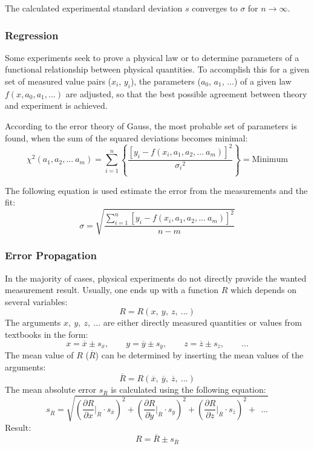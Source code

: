 The calculated experimental standard deviation $s$ converges to $\sigma$ for $n\to\infty$.

\subsubsection{Regression}
\label{subsubsec:Regression}
Some experiments seek to prove a physical law or to determine parameters of a functional relationship between physical quantities. To accomplish this for a given set of measured value pairs ($x_i$, $y_i$), the parameters ($a_0$, $a_1$, ...) of a given law $f(x, a_0, a_1, ...)$ are adjusted, so that the best possible agreement between theory and experiment is achieved.

According to the error theory of Gauss, the most probable set of parameters is found, when the sum of the squared deviations becomes minimal: 
\begin{equation}
\chi^2(a_1, a_2, ...\ a_m)=\sum_{i=1}^{n}\left\{\frac{[y_i-f(x_i, a_1, a_2, ...\ a_m)]^2}{{\sigma_i}^2}\right\}=\text{Minimum}
\end{equation}

The following equation is used estimate the error from the measurements and the fit:
\begin{equation}
\sigma=\sqrt{\frac{\sum\limits_{i=1}^{n}[y_i-f(x_i, a_1, a_2, ...\ a_m)]^2}{n-m}}
\end{equation}

\subsubsection{Error Propagation}
\label{subsubsec:Error_Propagation}
In the majority of cases, physical experiments do not directly provide the wanted measurement result. Usually, one ends up with a function $R$ which depends on several variables:
\[
R=R(x,\ y,\ z,\ ...)
\]
The arguments $x,\ y,\ z,\ ...$ are either directly measured quantities or values from textbooks in the form:
\[
x={\overline{x}}\pm s_{\overline{x}},\qquad y={\overline{y}}\pm s_{\overline{y}},\qquad z={\overline{z}}\pm s_{\overline{z}},\qquad ...
\]
The mean value of $R$ ($\overline R$) can be determined by inserting the mean values of the arguments:
\begin{equation}
\overline{R}=R(\overline{x},\ \overline{y},\ \overline{z},\ ...)
\label{eq:Error_Propagation_Mean}
\end{equation}
The mean absolute error $s_{\overline R}$ is calculated using the following equation:
\begin{equation}
s_{\overline{R}}=\sqrt{\left(\frac{\partial R}{\partial x}\Biggr|_{\overline R}\cdot s_{\overline{x}}\right)^2 + \left(\frac{\partial R}{\partial y}\Biggr|_{\overline R}\cdot s_{\overline{y}}\right)^2 + \left(\frac{\partial R}{\partial z}\Biggr|_{\overline R}\cdot s_{\overline{z}}\right)^2 +\ \ ...}
\label{eq:Error_Propagation}
\end{equation}
Result:
\begin{equation}
R=\overline R \pm s_{\overline R}
\label{eq:Error_Propagation_Result}
\end{equation}
